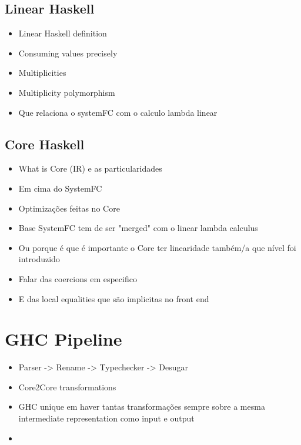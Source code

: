 \documentclass[]{lwnovathesis}
\begin{document}
\subsection{Linear Haskell\label{linear-haskell-section}}

\begin{itemize}
    \item Linear Haskell definition
    \item Consuming values precisely
    \item Multiplicities
    \item Multiplicity polymorphism
    \item Que relaciona o systemFC com o calculo lambda linear
\end{itemize}

\subsection{Core Haskell\label{core-section}}

\begin{itemize}
    \item What is Core (IR) e as particularidades
    \item Em cima do SystemFC
    \item Optimizações feitas no Core
    \item Base SystemFC tem de ser "merged" com o linear lambda calculus
    \item Ou porque é que é importante o Core ter linearidade também/a que nível
        foi introduzido
    \item Falar das coercions em especifico
    \item E das local equalities que são implicitas no front end
\end{itemize}

\section{GHC Pipeline}

\begin{itemize}
    \item Parser -> Rename -> Typechecker -> Desugar
    \item Core2Core transformations
    \item GHC unique em haver tantas transformações sempre sobre a mesma intermediate
        representation como input e output
    \item 
\end{itemize}
\end{document}
